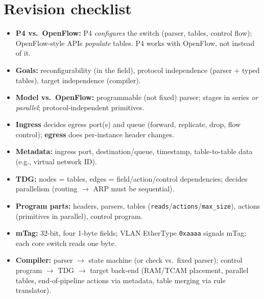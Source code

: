 \section{Revision checklist}
\begin{itemize}
\item \textbf{P4 vs.\ OpenFlow:} P4 \emph{configures} the switch (parser, tables, control flow); OpenFlow-style APIs \emph{populate} tables. P4 works with OpenFlow, not instead of it.
\item \textbf{Goals:} reconfigurability (in the field), protocol independence (parser + typed tables), target independence (compiler).
\item \textbf{Model vs.\ OpenFlow:} programmable (not fixed) parser; stages in series \emph{or parallel}; protocol-independent primitives.
\item \textbf{Ingress} decides egress port(s) and queue (forward, replicate, drop, flow control); \textbf{egress} does per-instance header changes.
\item \textbf{Metadata:} ingress port, destination/queue, timestamp, table-to-table data (e.g., virtual network ID).
\item \textbf{TDG:} nodes = tables, edges = field/action/control dependencies; decides parallelism (routing $\rightarrow$ ARP must be sequential).
\item \textbf{Program parts:} headers, parsers, tables (\texttt{reads}/\texttt{actions}/\texttt{max\_size}), actions (primitives in parallel), control program.
\item \textbf{mTag:} 32-bit, four 1-byte fields; VLAN EtherType \texttt{0xaaaa} signals mTag; each core switch reads one byte.
\item \textbf{Compiler:} parser $\rightarrow$ state machine (or check vs.\ fixed parser); control program $\rightarrow$ TDG $\rightarrow$ target back-end (RAM/TCAM placement, parallel tables, end-of-pipeline actions via metadata, table merging via rule translator).
\end{itemize}
